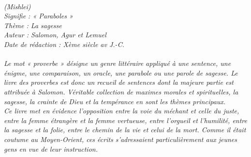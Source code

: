 \BFont
\noindent\hrulefill
\textit{
\bigskip
{\centering{}
\\(Mishlei)
\\Signifie : « Paraboles »
\\Thème : La sagesse
\\Auteur : Salomon, Agur et Lemuel
\\Date de rédaction : Xème siècle av J.-C.\\}
}
\textit{
\\Le  mot  « proverbe » désigne un genre littéraire appliqué à une sentence, une énigme, une comparaison, un oracle, une parabole ou une parole de sagesse. Le livre des proverbes est donc un recueil de sentences dont la majeure partie est attribuée à Salomon. Véritable collection de maximes morales et spirituelles, la sagesse, la crainte de Dieu et la tempérance en sont les thèmes principaux. 
\bigskip
\\Ce livre met en évidence l’opposition entre la voie du méchant et celle du juste, entre la femme étrangère et la femme vertueuse,  entre l’orgueil et l’humilité, entre la sagesse et la folie, entre le chemin de la vie et celui de la mort.  Comme il était coutume au Moyen-Orient, ces écrits s’adressaient particulièrement aux jeunes gens en vue de leur instruction.\bigskip
}
\par\nobreak\noindent\hrulefill
